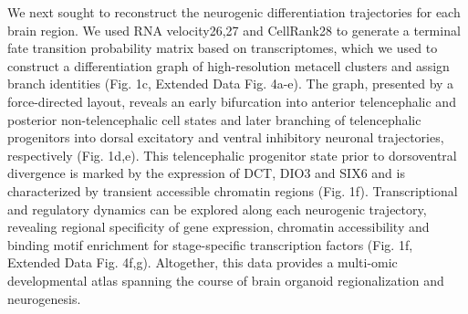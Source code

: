 We next sought to reconstruct the neurogenic differentiation trajectories for each brain region. We used RNA velocity26,27 and CellRank28 to generate a terminal fate transition probability matrix based on transcriptomes, which we used to construct a differentiation graph of high-resolution metacell clusters and assign branch identities (Fig. 1c, Extended Data Fig. 4a-e). The graph, presented by a force-directed layout, reveals an early bifurcation into anterior telencephalic and posterior non-telencephalic cell states and later branching of telencephalic progenitors into dorsal excitatory and ventral inhibitory neuronal trajectories, respectively (Fig. 1d,e). This telencephalic progenitor state prior to dorsoventral divergence is marked by the expression of DCT, DIO3 and SIX6 and is characterized by transient accessible chromatin regions (Fig. 1f). Transcriptional and regulatory dynamics can be explored along each neurogenic trajectory, revealing regional specificity of gene expression, chromatin accessibility and binding motif enrichment for stage-specific transcription factors (Fig. 1f, Extended Data Fig. 4f,g). Altogether, this data provides a multi-omic developmental atlas spanning the course of brain organoid regionalization and neurogenesis.
 
